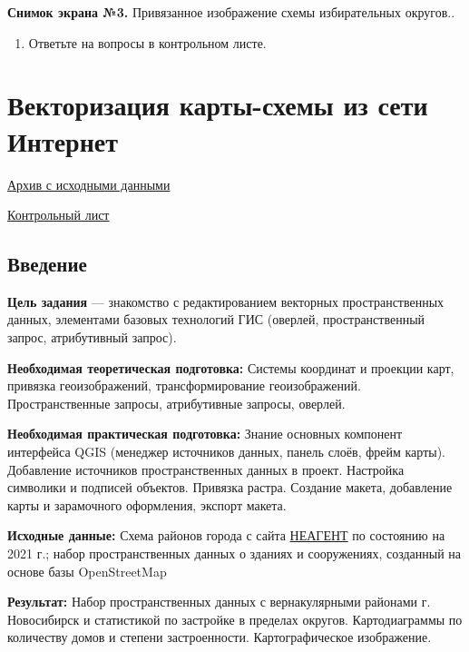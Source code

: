 \documentclass[
  12pt,
]{book}
\providecommand{\tightlist}{%
  \setlength{\itemsep}{0pt}\setlength{\parskip}{0pt}}
\begin{document}
\textbf{Снимок экрана №3.} Привязанное изображение схемы избирательных округов..

\begin{enumerate}
\def\labelenumi{\arabic{enumi}.}
\setcounter{enumi}{12}
\tightlist
\item
  Ответьте на вопросы в контрольном листе.
\end{enumerate}

\hypertarget{digitizing-districts}{%
\chapter{Векторизация карты-схемы из сети Интернет}\label{digitizing-districts}}

\href{https://github.com/aentin/qgis-course/raw/master/files/Ex06.zip}{Архив с исходными данными}

\href{https://github.com/aentin/qgis-course/raw/master/files/Ex06_\%D0\%BE\%D1\%82\%D1\%87\%D1\%91\%D1\%82.docx}{Контрольный лист}

\hypertarget{digitizing-intro}{%
\section{Введение}\label{digitizing-intro}}

\textbf{Цель задания} --- знакомство с редактированием векторных пространственных данных, элементами базовых технологий ГИС (оверлей, пространственный запрос, атрибутивный запрос).

\textbf{Необходимая теоретическая подготовка:} Системы координат и проекции карт, привязка геоизображений, трансформирование геоизображений. Пространственные запросы, атрибутивные запросы, оверлей.

\textbf{Необходимая практическая подготовка:} Знание основных компонент интерфейса QGIS (менеджер источников данных, панель слоёв, фрейм карты). Добавление источников пространственных данных в проект. Настройка символики и подписей объектов. Привязка растра. Создание макета, добавление карты и зарамочного оформления, экспорт макета.

\textbf{Исходные данные:} Схема районов города с сайта \href{https://neagent.info/}{НЕАГЕНТ} по состоянию на 2021 г.; набор пространственных данных о зданиях и сооружениях, созданный на основе базы OpenStreetMap

\textbf{Результат:} Набор пространственных данных с вернакулярными районами г. Новосибирск и статистикой по застройке в пределах округов. Картодиаграммы по количеству домов и степени застроенности. Картографическое изображение.
\end{document}
